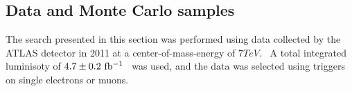 


\subsection{Data and Monte Carlo samples}\label{sect:samples}

The search presented in this section was performed using data collected by the ATLAS detector in 2011 at a center-of-mass-energy of $7 TeV$.~\cite{1748-0221-3-08-S08003}
A total integrated luminisoty of $4.7\pm0.2~\mbox{fb$^{-1}$}{}$~\cite{Aad:2011dr,ATLAS-CONF-2011-116} was used, and the data was selected using triggers on single electrons or muons.




